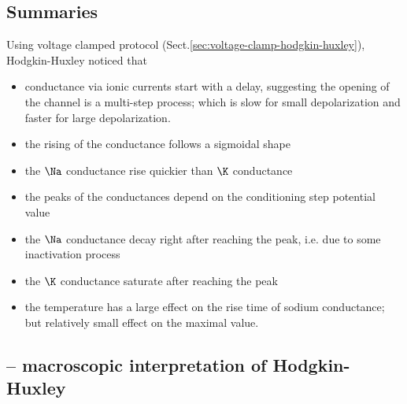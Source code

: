 \subsection{Summaries}

Using voltage clamped protocol (Sect.\ref{sec:voltage-clamp-hodgkin-huxley}),
Hodgkin-Huxley noticed that

\begin{itemize}
  \item conductance via ionic currents start with a delay, suggesting the
  opening of the channel is a multi-step process; which is slow for small
  depolarization and faster for large depolarization.
  
  \item the rising of the conductance follows a sigmoidal shape
  \item the $\Na$ conductance rise quickier than $\K$ conductance
  \item the peaks of the conductances depend on the conditioning step potential
  value
  
  
  \item the $\Na$ conductance decay right after reaching the peak, i.e. due to
  some inactivation process
  \item the $\K$ conductance saturate after reaching the peak
  
  \item the temperature has a large effect on the rise time of sodium
  conductance; but relatively small effect on the maximal value.
\end{itemize}

\subsection{-- macroscopic interpretation of Hodgkin-Huxley}

